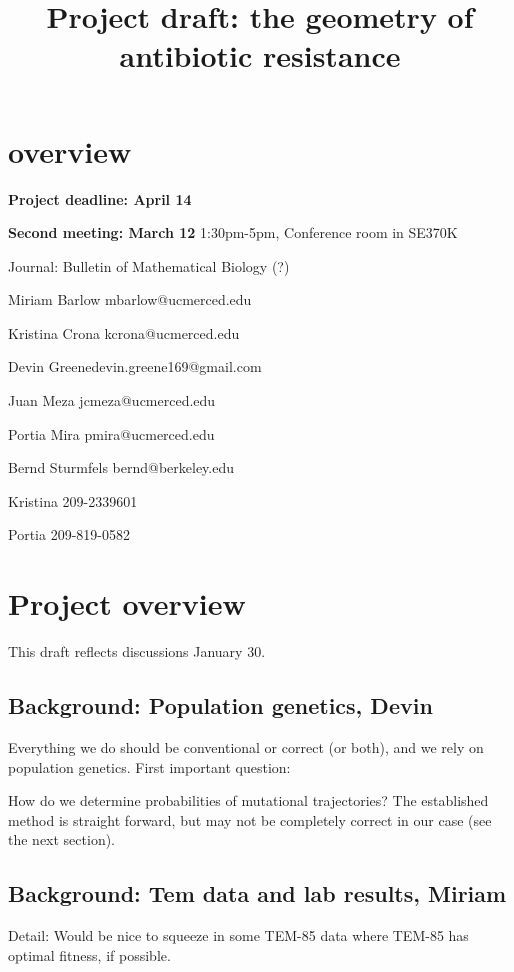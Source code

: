 \documentclass[12pt]{amsart}
\title{Project draft: the geometry of antibiotic resistance}
\theoremstyle{plain}
\theoremstyle{definition}
\begin{document}
\maketitle







\section{overview}

{\bf{Project deadline: April 14}}

\bigskip
{\bf{Second meeting: March 12}}
1:30pm-5pm, Conference room in SE370K 

\bigskip
Journal: Bulletin of Mathematical Biology (?)

\bigskip
\bigskip
Miriam Barlow \quad mbarlow@ucmerced.edu

Kristina Crona \quad kcrona@ucmerced.edu 

Devin Greene\quad devin.greene169@gmail.com

Juan Meza \quad jcmeza@ucmerced.edu

Portia Mira \quad pmira@ucmerced.edu

Bernd Sturmfels \quad bernd@berkeley.edu

\bigskip
Kristina 209-2339601

Portia 209-819-0582 



\section{Project overview}
This draft reflects discussions January 30.

\subsection{Background: Population genetics, Devin}
Everything we do should be
conventional or correct (or both),
and we rely on population genetics.
First important question:

How do we determine probabilities of mutational trajectories?
The established method is straight forward,
but may not be completely correct in our case (see the next section).

\subsection{Background: Tem data and lab results, Miriam}
Detail: Would be nice to squeeze in some TEM-85 data
where TEM-85 has optimal fitness, if possible.
\end{document}
